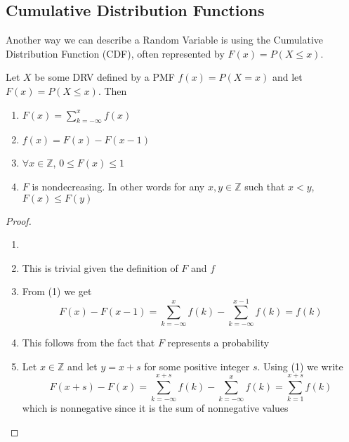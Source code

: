 \subsection{Cumulative Distribution Functions}
Another way we can describe a Random Variable is using the Cumulative Distribution Function (CDF), often represented by $F(x)=P(X\le x)$. 
\begin{theorem}
    Let $X$ be some DRV defined by a PMF $f(x)=P(X=x)$ and let $F(x)=P(X\le x)$. Then
    \begin{enumerate}
        \item $F(x)=\displaystyle\sum_{k=-\infty}^x f(x)$
        \item $f(x)=F(x)-F(x-1)$
        \item $\forall x\in\mathbb Z$, $0\le F(x) \le 1$
        \item $F$ is nondecreasing. In other words for any $x,y\in\mathbb Z$ such that $x<y$, $F(x)\le F(y)$
    \end{enumerate}
    \begin{proof}
        \begin{enumerate}
            \item[]
            \item This is trivial given the definition of $F$ and $f$
            \item From (1) we get
            \[
                F(x)-F(x-1)=\sum_{k=-\infty}^x f(k) - \sum_{k=-\infty}^{x-1} f(k) =f(k)
            \]
            \item This follows from the fact that $F$ represents a probability 
            \item Let $x\in\mathbb Z$ and let $y=x+s$ for some positive integer $s$. Using (1) we write
            \[
                F(x+s)-F(x)=\sum_{k=-\infty}^{x+s} f(k) - \sum_{k=-\infty}^{x} f(k) = \sum_{k=1}^{x+s} f(k) 
            \]
            which is nonnegative since it is the sum of nonnegative values
        \end{enumerate}
        
    \end{proof}
\end{theorem}
